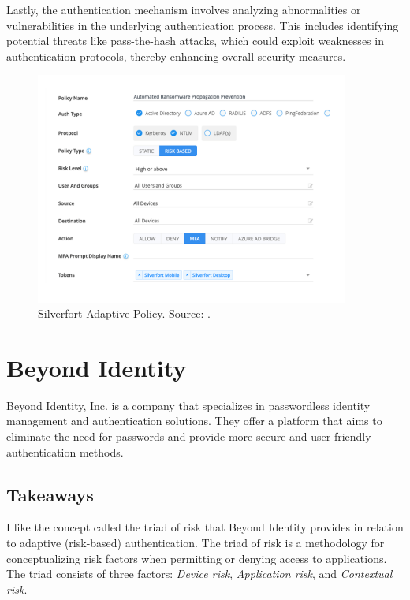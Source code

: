 Lastly, the authentication mechanism involves analyzing abnormalities or vulnerabilities in the underlying authentication process.
This includes identifying potential threats like pass-the-hash attacks, which could exploit weaknesses in authentication protocols, thereby enhancing overall security measures. \cite{existing-silverfort-risk} \cite{existing-silverfort-analysis}


\begin{figure}[htbp]
  \centering
  \includegraphics[width=0.92\textwidth]{img/silverfort-auth-policy.png}
  \caption[Silverfort Adaptive Policy]{Silverfort Adaptive Policy. Source: \cite{example_silverfort}.}
  \label{fig:silverfort-auth-policy}
\end{figure}

\newpage
\section{Beyond Identity}

Beyond Identity, Inc. is a company that specializes in passwordless identity management and authentication solutions. They offer a platform that aims to eliminate the need for passwords and provide more secure and user-friendly authentication methods.

\subsection*{Takeaways}
I like the concept called the triad of risk that Beyond Identity provides in relation to adaptive (risk-based) authentication.
The triad of risk is a methodology for conceptualizing risk factors when permitting or denying access to applications.
The triad consists of three factors: \textit{Device risk}, \textit{Application risk}, and \textit{Contextual risk}.

